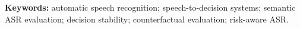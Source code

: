 \documentclass[11pt]{article}
\begin{document}
\noindent\textbf{Keywords:} automatic speech recognition; speech-to-decision systems; semantic ASR evaluation; decision stability; counterfactual evaluation; risk-aware ASR.












\end{document}
